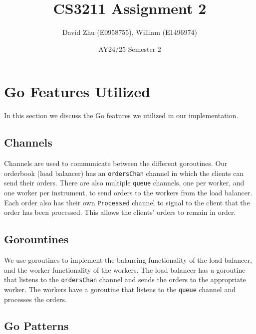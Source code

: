 \documentclass[11pt]{article}
\title{CS3211 Assignment 2}
\author{David Zhu (E0958755), William (E1496974)}
\date{AY24/25 Semester 2}
\begin{document}
\maketitle

\section{Go Features Utilized}

In this section we discuss the Go features we utilized in our implementation.

\subsection{Channels}

Channels are used to communicate between the different goroutines. Our orderbook (load balancer) has
an \texttt{ordersChan} channel in which the clients can send their orders.
There are also multiple \texttt{queue} channels, one per worker, and one worker per instrument, to send orders to the workers from the load balancer.
Each order also has their own \texttt{Processed} channel to signal to the client that the order has been processed. This allows the clients' orders to remain in order.

\subsection{Gorountines}

We use goroutines to implement the balancing functionality of the load balancer, and the worker functionality of the workers.
The load balancer has a goroutine that listens to the \texttt{ordersChan} channel and sends the orders to the appropriate worker.
The workers have a goroutine that listens to the \texttt{queue} channel and processes the orders.

\subsection{Go Patterns}
\end{document}
